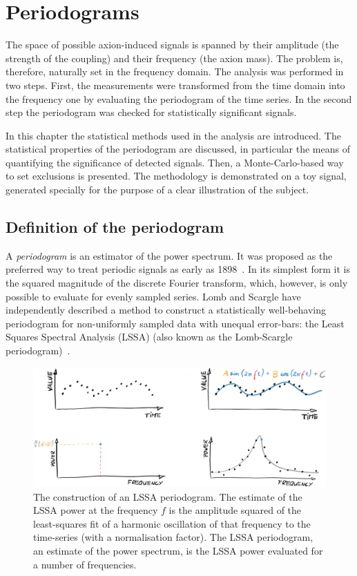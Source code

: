\chapter{Periodograms}
\label{ch:axions-periodograms}
The space of possible axion-induced signals is spanned by their amplitude (the strength of the coupling) and their frequency (the axion mass).
The problem is, therefore, naturally set in the frequency domain.
The analysis was performed in two steps.
First, the measurements were transformed from the time domain into the frequency one by evaluating the periodogram of the time series.
In the second step the periodogram was checked for statistically significant signals.

In this chapter the statistical methods used in the analysis are introduced.
The statistical properties of the periodogram are discussed, in particular the means of quantifying the significance of detected signals.
Then, a Monte-Carlo-based way to set exclusions is presented.
The methodology is demonstrated on a toy signal, generated specially for the purpose of a clear illustration of the subject.




\section{Definition of the periodogram}
A \emph{periodogram} is an estimator of the power spectrum.
It was proposed as the preferred way to treat periodic signals as early as 1898~\cite{Schuster1898}.
In its simplest form it is the squared magnitude of the discrete Fourier transform, which, however, is only possible to evaluate for evenly sampled series.
Lomb and Scargle have independently described a method to construct a statistically well-behaving periodogram for non-uniformly sampled data with unequal error-bars: the Least Squares Spectral Analysis (LSSA) (also known as the Lomb-Scargle periodogram)~\cite{Scargle1982}.

\begin{figure}
  \centering
  \includegraphics[width=\linewidth]{gfx/axions/LSSA.png}
  \caption{The construction of an LSSA periodogram.
  The estimate of the LSSA power at the frequency $f$ is the amplitude squared of the least-squares fit of a harmonic oscillation of that frequency to the time-series (with a normalisation factor).
  The LSSA periodogram, an estimate of the power spectrum, is the LSSA power evaluated for a number of frequencies.}\label{fig:LSSA_overview}
\end{figure}

